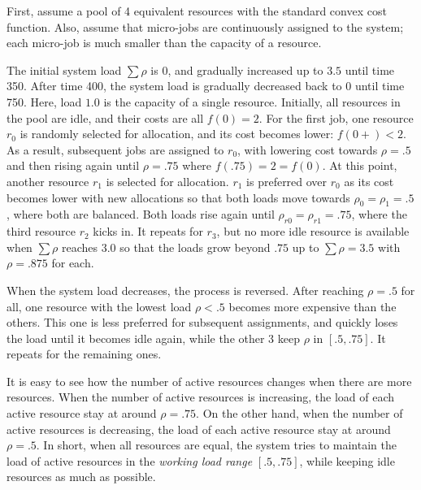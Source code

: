 First, assume a pool of 4 equivalent resources with the standard convex
cost function.
Also, assume that micro-jobs are continuously assigned to the
system; each micro-job is much smaller than the capacity of a
resource.

The initial system load $\sum \rho$ is $0$, and gradually increased up
to $3.5$ until time 350. After time 400, the system load is gradually
decreased back to $0$ until time 750.
Here, load $1.0$ is the capacity of a single resource. 
Initially, all resources in the pool are idle, and their costs are
all $f(0)= 2$.
For the first job, one resource $r_{0}$ is randomly selected for allocation, and its
cost becomes lower: $f(0+) < 2$. As a result, subsequent jobs are
assigned to $r_{0}$, with lowering cost towards $\rho = .5$ and then
rising again until $\rho = .75$ where $f(.75) = 2 = f(0)$.
At this point, another resource $r_{1}$ is selected for allocation.
$r_{1}$ is preferred over $r_{0}$ as its cost becomes lower with new
allocations so that both loads move towards $\rho_{0} = \rho_{1} = .5$,
where both are balanced.
Both loads rise again until $\rho_{r0} = \rho_{r1} = .75$,
where the third resource $r_{2}$ kicks in.
It repeats for $r_{3}$, but no more idle resource is available
when $\sum \rho$ reaches $3.0$ so that the loads grow beyond $.75$
up to $\sum \rho = 3.5$ with $\rho = .875$ for each.

When the system load decreases, the process is reversed.
After reaching $\rho = .5$ for all,
one resource with the lowest load $\rho < .5$ becomes more expensive
than the others.
This one is less preferred for subsequent assignments, and quickly
loses the load until it becomes idle again, while the other 3 keep
$\rho$ in $[.5, .75]$. It repeats for the remaining ones.

It is easy to see how the number of active resources changes when
there are more resources.
When the number of active resources is increasing, the load of each
active resource stay at around $\rho = .75$.
On the other hand, when the number of active resources is decreasing,
the load of each active resource stay at around $\rho = .5$.
In short, when all resources are equal, the system tries to maintain
the load of active resources in the {\em working load range}
$[.5, .75]$, while keeping idle resources as much as possible.

